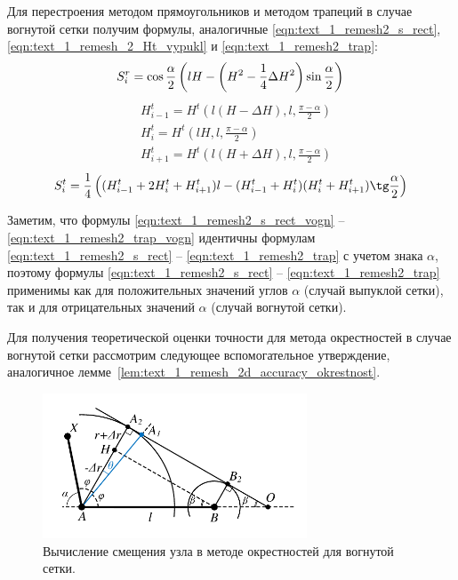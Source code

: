 Для перестроения методом прямоугольников и методом трапеций в случае вогнутой сетки получим формулы, аналогичные \eqref{eqn:text_1_remesh2_s_rect}, \eqref{eqn:text_1_remesh_2_Ht_vypukl} и \eqref{eqn:text_1_remesh2_trap}:
\begin{equation}\label{eqn:text_1_remesh2_s_rect_vogn}
	S_i^r = \cos \frac{\alpha}{2} \left( lH - \left( H^2 - \frac{1}{4} \Delta H^2 \right) \sin \frac{\alpha}{2} \right) \\
\end{equation}
\begin{equation}\label{eqn:text_1_remesh_2_Ht_vogn}
	\begin{aligned}
	& H_{i - 1}^t = H^t\left(l(H - \Delta H), l, \frac{\pi - \alpha}{2}\right) \\ 
	& H_i^t = H^t\left(lH, l, \frac{\pi - \alpha}{2}\right) \\
	& H_{i + 1}^t = H^t\left(l(H + \Delta H), l, \frac{\pi - \alpha}{2}\right)
	\end{aligned}
\end{equation}
\begin{equation}\label{eqn:text_1_remesh2_trap_vogn}
	S_i^t = \frac{1}{4} \left( (H_{i - 1}^t + 2 H_i^t + H_{i + 1}^t)l - (H_{i - 1}^t + H_i^t) (H_i^t + H_{i+1}^t) \tg \frac{\alpha}{2} \right)
\end{equation}

Заметим, что формулы \eqref{eqn:text_1_remesh2_s_rect_vogn} -- \eqref{eqn:text_1_remesh2_trap_vogn} идентичны формулам \eqref{eqn:text_1_remesh2_s_rect} -- \eqref{eqn:text_1_remesh2_trap} с учетом знака $\alpha$, поэтому формулы \eqref{eqn:text_1_remesh2_s_rect} -- \eqref{eqn:text_1_remesh2_trap} применимы как для положительных значений углов $\alpha$ (случай выпуклой сетки), так и для отрицательных значений $\alpha$ (случай вогнутой сетки).

Для получения теоретической оценки точности для метода окрестностей в случае вогнутой сетки рассмотрим следующее вспомогательное утверждение, аналогичное лемме~\ref{lem:text_1_remesh_2d_accuracy_okrestnost}.

\begin{figure}[ht]
\centering
\includegraphics[width=0.7\textwidth]{pics/text_1_remesh_2d/accuracy_okrestnost2.pdf}
\singlespacing
{}\caption{Вычисление смещения узла в методе окрестностей для вогнутой сетки.}
\label{fig:text_1_remesh_2d_accuracy_okrestnost}
\end{figure}

